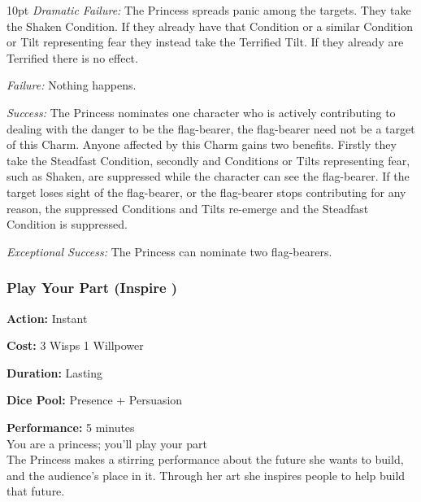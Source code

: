 \begin{myindentpar}{10pt}  \emph{Dramatic Failure:} The Princess spreads panic among the targets. They take the Shaken Condition. If they already have that Condition or a similar Condition or Tilt representing fear they instead take the Terrified Tilt. If they already are Terrified there is no effect.

    \emph{Failure:}  Nothing happens. 

    \emph{Success:} The Princess nominates one character who is actively contributing to dealing with the danger to be the flag-bearer, the flag-bearer need not be a target of this Charm. Anyone affected by this Charm gains two benefits. Firstly they take the Steadfast Condition, secondly and Conditions or Tilts representing fear, such as Shaken, are suppressed while the character can see the flag-bearer. If the target loses sight of the flag-bearer, or the flag-bearer stops contributing for any reason, the suppressed Conditions and Tilts re-emerge and the Steadfast Condition is suppressed. 

    \emph{Exceptional Success:} The Princess can nominate two flag-bearers. 
	
	\end{myindentpar}


\subsubsection*{Play Your Part (Inspire \textbullet\textbullet\textbullet)}

\noindent \textbf{Action:} Instant

\noindent \textbf{Cost:} 3 Wisps 1 Willpower

\noindent \textbf{Duration:} Lasting 

\noindent \textbf{Dice Pool:} Presence + Persuasion 

\noindent \textbf{Performance:} 5 minutes \\

\noindent You are a princess; you'll play your part\\

The Princess makes a stirring performance about the future she wants to build, and the audience's place in it. Through her art she inspires people to help build that future. 

